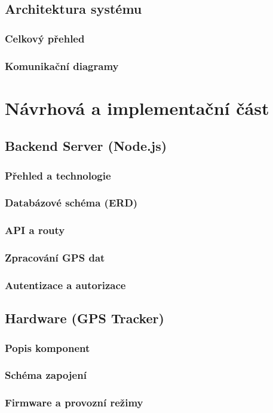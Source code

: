 \documentclass[12pt, a4paper]{report}
\begin{document}
\chapter{Architektura systému}
\section{Celkový přehled}
\section{Komunikační diagramy}


\part{Návrhová a implementační část}
\chapter{Backend Server (Node.js)}
\section{Přehled a technologie}
\section{Databázové schéma (ERD)}
\section{API a routy}
\section{Zpracování GPS dat}
\section{Autentizace a autorizace}


\chapter{Hardware (GPS Tracker)}
\section{Popis komponent}
\section{Schéma zapojení}
\section{Firmware a provozní režimy}
\end{document}
